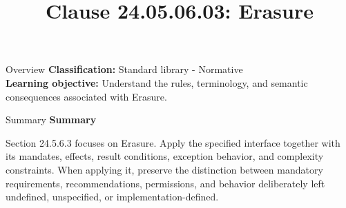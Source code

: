\documentclass[10pt,letterpaper]{article}
\title{Clause 24.05.06.03: Erasure}
\author{}
\date{}
\begin{document}
\maketitle
\begin{CornellOverviewBox}{Overview}
\textbf{Classification:} Standard library - Normative\\[2pt]
\textbf{Learning objective:} Understand the rules, terminology, and semantic consequences associated with Erasure.
\end{CornellOverviewBox}\begin{CornellSummaryBox}{Summary}
{\sffamily\bfseries\color{Accent} Summary}\par\vspace{3pt}Section 24.5.6.3 focuses on Erasure. Apply the specified interface together with its mandates, effects, result conditions, exception behavior, and complexity constraints. When applying it, preserve the distinction between mandatory requirements, recommendations, permissions, and behavior deliberately left undefined, unspecified, or implementation-defined.
\end{CornellSummaryBox}
\end{document}
